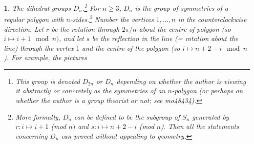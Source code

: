 \documentclass[a4paper,11pt,final,openany]{memoir}%
\newtheorem{plain}[X]{}
\theoremstyle{nonumberplain}
\begin{document}
\begin{plain}
\label{bd8b}\emph{The dihedral groups} $D_{n}$.\footnote{This group is denoted
$D_{2n}$ or $D_{n}$ depending on whether the author is viewing it abstractly
or concretely as the symmetries of an $n$-polygon (or perhaps on whether the
author is a group theorist or not; see mo48434).}%
%
For $n\geq3$, $D_{n}$ is the group of symmetries of a regular polygon with
$n$-sides.\footnote{More formally, $D_{n}$ can be defined to be the subgroup
of $S_{n}$ generated by $r\colon i\mapsto i+1$ (mod $n)$ and $s\colon i\mapsto
n+2-i$ (mod $n$). Then all the statements concerning $D_{n}$ can proved
without appealing to geometry.} Number the vertices $1,\ldots,n$ in the
counterclockwise direction. Let $r$ be the rotation through $2\pi/n$ about the
centre of polygon (so $i\mapsto i+1\mod
n)$, and let $s$ be the reflection in the line (= rotation about the line)
through the vertex $1$ and the centre of the polygon (so $i\mapsto
n+2-i\mod n$). For example, the pictures \bigskip


\end{plain}
\end{document}
